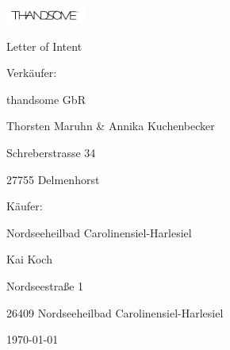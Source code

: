 \documentclass[a4paper,oneside,english,american,ngerman]{article}
\begin{document}
\begin{titlepage}
    \begin{flushright}
         \includegraphics[width=0.2\textwidth]{./pictures/logo.png}
    \end{flushright}
    
    \vspace{3cm}

    \begin{center}
        {\Large \color{stirlinggreen} Letter of Intent \par}
        \vspace{1cm}
        {\LARGE \color{stirlinggreen} Verkäufer: \par}
        {\LARGE \color{stirlinggreen} thandsome GbR \par}
        {\color{stirlinggreen} Thorsten Maruhn \& Annika Kuchenbecker\par}
        {\color{stirlinggreen} Schreberstrasse 34 \par}
        {\color{stirlinggreen} 27755 Delmenhorst \par}

        \vspace{1cm}
        
        {\LARGE \color{stirlinggreen} Käufer: \par}
        {\LARGE \color{stirlinggreen} Nordseeheilbad Carolinensiel-Harlesiel    \par}
        {\color{stirlinggreen} Kai Koch \par}
        {\color{stirlinggreen} Nordseestraße 1 \par}
        {\color{stirlinggreen} 26409 Nordseeheilbad Carolinensiel-Harlesiel \par}


        {\large \color{stirlinggold} \today \par}
    \end{center}
\end{titlepage}
\end{document}

